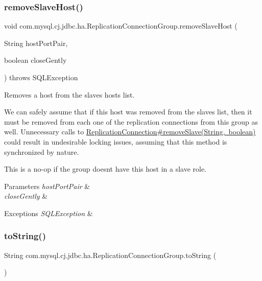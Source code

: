 \subsubsection{\texorpdfstring{remove\+Slave\+Host()}{removeSlaveHost()}}
{\footnotesize\ttfamily void com.\+mysql.\+cj.\+jdbc.\+ha.\+Replication\+Connection\+Group.\+remove\+Slave\+Host (\begin{DoxyParamCaption}\item[{String}]{host\+Port\+Pair,  }\item[{boolean}]{close\+Gently }\end{DoxyParamCaption}) throws S\+Q\+L\+Exception}

Removes a host from the slaves hosts list.

We can safely assume that if this host was removed from the slaves list, then it must be removed from each one of the replication connections from this group as well. Unnecessary calls to \mbox{\hyperlink{interfacecom_1_1mysql_1_1cj_1_1jdbc_1_1ha_1_1_replication_connection_ac4e3f61d87c2f40d760917c843b4a4aa}{Replication\+Connection\#remove\+Slave(\+String, boolean)}} could result in undesirable locking issues, assuming that this method is synchronized by nature.

This is a no-\/op if the group doesn\textquotesingle{}t have this host in a slave role.


\begin{DoxyParams}{Parameters}
{\em host\+Port\+Pair} & \\
\hline
{\em close\+Gently} & \\
\hline
\end{DoxyParams}

\begin{DoxyExceptions}{Exceptions}
{\em S\+Q\+L\+Exception} & \\
\hline
\end{DoxyExceptions}
\mbox{\label{classcom_1_1mysql_1_1cj_1_1jdbc_1_1ha_1_1_replication_connection_group_a3acb730154c5ca1be9bef539ac44d4ed}} 
\subsubsection{\texorpdfstring{to\+String()}{toString()}}
{\footnotesize\ttfamily String com.\+mysql.\+cj.\+jdbc.\+ha.\+Replication\+Connection\+Group.\+to\+String (\begin{DoxyParamCaption}{ }\end{DoxyParamCaption})}



